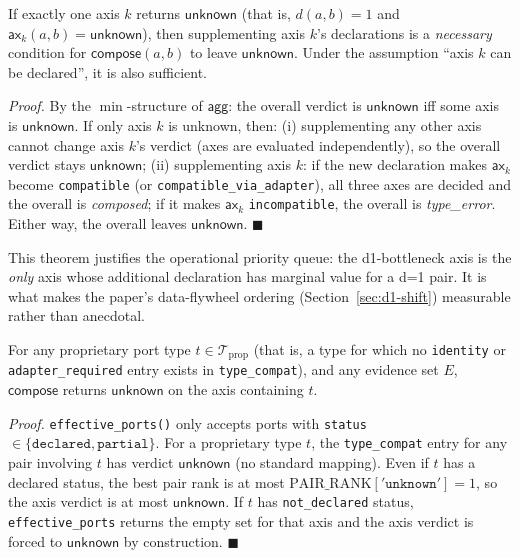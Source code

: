 \documentclass[11pt,twocolumn]{article}
\begin{document}
\begin{theorem}
\label{thm:bottleneck}
If exactly one axis $k$ returns $\mathsf{unknown}$
(that is, $d(a, b) = 1$ and $\mathsf{ax}_k(a, b) =
\mathsf{unknown}$), then supplementing axis $k$'s declarations is
a \emph{necessary} condition for $\mathsf{compose}(a, b)$ to leave
$\mathsf{unknown}$. Under the assumption ``axis $k$ can be
declared'', it is also sufficient.
\end{theorem}

\emph{Proof.} By the $\min$-structure of $\mathsf{agg}$:
the overall verdict is $\mathsf{unknown}$ iff some axis is
$\mathsf{unknown}$. If only axis $k$ is unknown, then:
(i) supplementing any other axis cannot change axis $k$'s verdict
(axes are evaluated independently), so the overall verdict stays
$\mathsf{unknown}$;
(ii) supplementing axis $k$: if the new declaration makes
$\mathsf{ax}_k$ become \texttt{compatible} (or
\texttt{compatible\_via\_adapter}), all three axes are decided and
the overall is \emph{composed}; if it makes $\mathsf{ax}_k$
\texttt{incompatible}, the overall is \emph{type\_error}. Either
way, the overall leaves $\mathsf{unknown}$. $\blacksquare$

This theorem justifies the operational priority queue: the
d1-bottleneck axis is the \emph{only} axis whose additional
declaration has marginal value for a d=1 pair. It is what makes
the paper's data-flywheel ordering (Section~\ref{sec:d1-shift})
measurable rather than anecdotal.

\begin{theorem}
\label{thm:undecidable}
For any proprietary port type $t \in \mathcal{T}_{\mathrm{prop}}$
(that is, a type for which no \texttt{identity} or
\texttt{adapter\_required} entry exists in \texttt{type\_compat}),
and any evidence set $E$, $\mathsf{compose}$ returns
$\mathsf{unknown}$ on the axis containing $t$.
\end{theorem}

\emph{Proof.} \texttt{effective\_ports()} only accepts ports with
\texttt{status} $\in \{\texttt{declared}, \texttt{partial}\}$.
For a proprietary type $t$, the \texttt{type\_compat} entry for
any pair involving $t$ has verdict $\mathsf{unknown}$ (no standard
mapping). Even if $t$ has a declared status, the best pair rank is
at most $\mathrm{PAIR\_RANK}['\texttt{unknown}'] = 1$, so the axis
verdict is at most $\mathsf{unknown}$. If $t$ has
\texttt{not\_declared} status, \texttt{effective\_ports} returns
the empty set for that axis and the axis verdict is forced to
$\mathsf{unknown}$ by construction. $\blacksquare$
\end{document}
